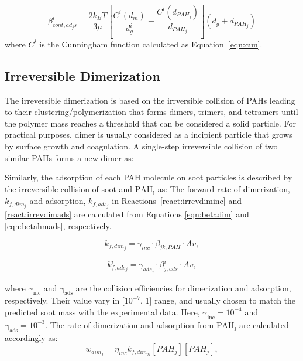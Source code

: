 \begin{equation}
	\beta^i_{cont, ad_js}=
	\frac{2 k_B T}{3 \mu}
	\left[
	\frac{C^i\left(d_m\right)}{d^i_g}+
	\frac{C^i\left(d_{PAH_j}\right)}{d_{PAH_j}}
	\right]
	\left(d_g+d_{PAH_j}\right)
	\label{eqn:betacontads}
\end{equation}
where $C^i$ is the Cunningham function calculated as Equation~\ref{eqn:cun}.
\subsection{Irreversible Dimerization}

The irreversible dimerization is based on the irrversible collision of PAHs leading to their clustering/polymerization that forms dimers, trimers, and tetramers until the polymer mass reaches a threshold that can be considered a solid particle. For practical purposes, dimer is usually considered as a incipient particle that grows by surface growth and coagulation. A single-step irreversible collision of two similar PAHs forms a new dimer as:

Similarly, the adsorption of each PAH molecule on soot particles is described by the irreversible collision of soot and $\mathrm{PAH_j}$ as:
The forward rate of dimerization, ${k_{f,dim_j}}$ and adsorption, $k_{f,ads_j}$ in Reactions~\eqref{react:irrevdiminc} and \eqref{react:irrevdimads} are calculated from Equations \eqref{eqn:betadim} and \eqref{eqn:betahmads}, respectively.

\begin{equation}
	k_{f,dim_j}=
	\gamma_{inc}\cdot\beta_{jk,PAH}\cdot Av
	\label{eqn:kfdim},
\end{equation}

\begin{equation}
	k^i_{f,ads_j}=
	\gamma_{ads_j}\cdot\beta^i_{j,ads}\cdot Av
	\label{eqn:kfads},
\end{equation}

where $\mathrm{\gamma_{inc}}$ and $\mathrm{\gamma_{ads}}$ are the collision efficiencies for dimerization and adsorption, respectively. Their value vary in [$\mathrm{10^{-7}}$, 1] range, and usually chosen to match the predicted soot mass with the experimental data. Here, $\mathrm{\gamma_{inc}}=10^{-4}$ and $\mathrm{\gamma_{ads}=10^{-3}}$. The rate of dimerization and adsorption from $\mathrm{PAH_j}$ are calculated accordingly as:
\begin{equation}
	w_{dim_j} = \eta_{inc} k_{f,dim_{jj}} [PAH_j] [PAH_j],
\end{equation}

